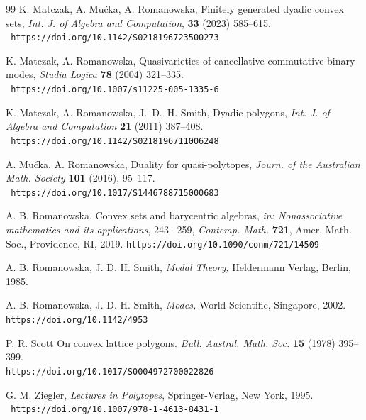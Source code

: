 \documentclass[12pt]{amsart}
\theoremstyle{plain}
\theoremstyle{definition}
\numberwithin{equation}{section}
\begin{document}
\begin{thebibliography}{99}
K. Matczak, A. Mu\'{c}ka, A. Romanowska,
Finitely generated dyadic convex sets,
{\em Int. J. of Algebra and Computation}, {\bf 33} (2023) 585--615.
\\ \texttt{ https://doi.org/10.1142/S0218196723500273 }

K. Matczak, A. Romanowska,
    Quasivarieties of cancellative commutative binary modes,
     {\em Studia Logica} {\bf 78} (2004) 321--335.
\\ \texttt{ https://doi.org/10.1007/s11225-005-1335-6 }

K. Matczak, A. Romanowska, J.~D.~H. Smith,
   Dyadic polygons,
   {\em Int. J. of Algebra and Computation} {\bf 21} (2011) 387--408.
\\ \texttt{ https://doi.org/10.1142/S0218196711006248 }

A. Mu\'{c}ka, A. Romanowska,
Duality for quasi-polytopes,
{\em Journ. of the Australian Math. Society} {\bf 101} (2016), 95--117.
\\ \texttt{ https://doi.org/10.1017/S1446788715000683  }

A. B. Romanowska,
Convex sets and barycentric algebras,
{\em in: Nonassociative mathematics and its applications}, 243-–259, {\em Contemp. Math.} {\bf 721},
Amer. Math. Soc., Providence, RI, 2019.
\texttt{https://doi.org/10.1090/conm/721/14509}

A. B. Romanowska, J. D. H. Smith,
    {\em Modal Theory,}
    Heldermann Verlag, Berlin, 1985.

A. B. Romanowska, J. D. H. Smith,
    {\em Modes,}
    World Scientific, Singapore, 2002.
\\ \texttt{https://doi.org/10.1142/4953}


P. R. Scott
On convex lattice polygons.
{\em Bull. Austral. Math. Soc.} {\bf 15} (1978) 395--399.
\\ \texttt{https://doi.org/10.1017/S0004972700022826 }	
	


G. M. Ziegler,
{\em Lectures in Polytopes},
Springer-Verlag, New York, 1995.
\\ \texttt{ https://doi.org/10.1007/978-1-4613-8431-1 }
\end{thebibliography}
\end{document}
